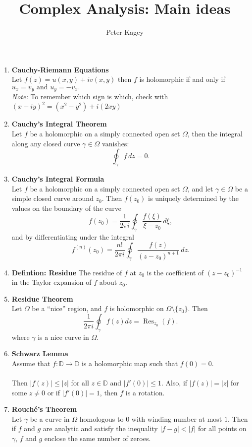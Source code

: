 \documentclass{article}
\begin{document}
\title{Complex Analysis: Main ideas}
\author{Peter Kagey}

\maketitle

\begin{enumerate}
  \item \textbf{Cauchy-Riemann Equations}\\
    Let $f(z) = u(x, y) + iv(x, y)$ then $f$ is holomorphic if and only if $
      u_x = v_y \text{ and } u_y = -v_x.
    $\\
    \textit{Note:} To remember which sign is which, check with
    $(x + iy)^2 = (x^2 - y^2) + i(2xy)$
  \item \textbf{Cauchy's Integral Theorem}\\
    Let $f$ be a holomorphic on a simply connected open set $\Omega$, then the
    integral along any closed curve $\gamma \in \Omega$ vanishes: \[
      \oint_\gamma f\,dz = 0.
    \]
  \item \textbf{Cauchy's Integral Formula}\\
    Let $f$ be a holomorphic on a simply connected open set $\Omega$, and let
    $\gamma \in \Omega$ be a simple closed curve around $z_0$. Then $f(z_0)$ is
    uniquely determined by the values on the boundary of the curve \[
      f(z_0) = \frac{1}{2\pi i}\oint_\gamma \frac{f(\xi)}{\xi - z_0}\,d\xi,
    \] and by differentiating under the integral \[
      f^{(n)}(z_0) = \frac{n!}{2\pi i}\oint_\gamma \frac{f(z)}{(z - z_0)^{n+1}}\,dz.
    \]
  \item \textbf{Defintion: Residue}
    The residue of $f$ at $z_0$ is the coefficient of $(z - z_0)^{-1}$ in the
    Taylor expansion of $f$ about $z_0$.
  \item \textbf{Residue Theorem}\\
    Let $\Omega$ be a ``nice'' region, and $f$ is holomorphic on
    $\Omega \setminus \{z_0\}$. Then \[
      \frac{1}{2\pi i}\oint_\gamma f(z) dz = \operatorname{Res}_{z_0}(f).
    \] where $\gamma$ is a nice curve in $\Omega$.

  \item \textbf{Schwarz Lemma}\\
    Assume that $f\colon \mathbb{D} \rightarrow \mathbb{D}$ is a holomorphic map
    such that $f(0) = 0$.\\~\\
    Then $|f(z)| \leq |z|$ for all $z \in \mathbb{D}$ and $|f'(0)| \leq 1$. Also, if
    $|f(z)| = |z|$ for some $z \not= 0$ or if $|f'(0)| = 1$, then $f$ is a rotation.

  \item \textbf{Rouch\'e's Theorem}\\
    Let $\gamma$ be a curve in $\Omega$ homologous to $0$ with winding number
    at most $1$. Then if $f$ and $g$ are analytic and satisfy the inequality
    $|f - g| < |f|$ for all points on $\gamma$, $f$ and $g$ enclose the same
    number of zeroes.

\end{enumerate}
\end{document}
